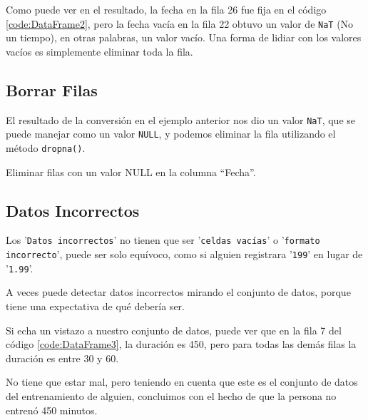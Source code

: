 Como puede ver en el resultado, la fecha en la fila 26 fue fija en el código \ref{code:DataFrame2}, pero la
fecha vacía en la fila 22 obtuvo un valor de \texttt{NaT} (No un
tiempo), en otras palabras, un valor vacío. Una forma de lidiar con los
valores vacíos es simplemente eliminar toda la fila.

\subsection{Borrar Filas}

El resultado de la conversión en el ejemplo anterior nos dio un valor
\texttt{NaT}, que se puede manejar como un valor \texttt{NULL}, y
podemos eliminar la fila utilizando el método \texttt{dropna()}.\\

\begin{code} Eliminar filas con un valor NULL en la columna ``Fecha''.

\begin{Shaded}
\begin{Highlighting}[]
\OperatorTok{=}\NormalTok{[}\NormalTok{], inplace }\OperatorTok{=} \NormalTok{)}
\end{Highlighting}
\end{Shaded}
\end{code}

\subsection{Datos Incorrectos}

Los '\texttt{Datos incorrectos}' no tienen que ser '\texttt{celdas vacías}' o '\texttt{formato
incorrecto}', puede ser solo equívoco, como si alguien registrara '\texttt{199}' en lugar de '\texttt{1.99}'.

A veces puede detectar datos incorrectos mirando el conjunto de datos,
porque tiene una expectativa de qué debería ser.

Si echa un vistazo a nuestro conjunto de datos, puede ver que en la fila
7 del código \ref{code:DataFrame3}, la duración es 450, pero para todas las demás filas la duración es
entre 30 y 60.

No tiene que estar mal, pero teniendo en cuenta que este es el conjunto
de datos del entrenamiento de alguien, concluimos con el hecho de que la
persona no entrenó 450 minutos.\\

